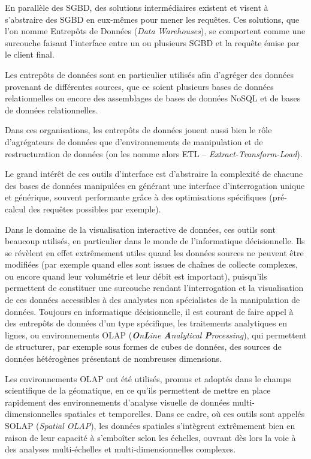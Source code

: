 			En parallèle des SGBD, des solutions intermédiaires existent et visent à s'abstraire des SGBD en eux-mêmes pour mener les requêtes.
			Ces solutions, que l'on nomme Entrepôts de Données (\textit{Data Warehouses}), se comportent comme une surcouche faisant l'interface entre un ou plusieurs SGBD et la requête émise par le client final.

			Les entrepôts de données sont en particulier utilisés afin d'agréger des données provenant de différentes sources, que ce soient plusieurs bases de données relationnelles ou encore des assemblages de bases de données NoSQL et de bases de données relationnelles.

			Dans ces organisations, les entrepôts de données jouent aussi bien le rôle d'agrégateurs de données que d'environnements de manipulation et de restructuration de données (on les nomme alors \og ETL\fg{} -- \textit{Extract-Transform-Load}).

			Le grand intérêt de ces outils d'interface est d'abstraire la complexité de chacune des bases de données manipulées en générant une interface d'interrogation unique et générique, souvent performante grâce à des optimisations spécifiques (pré-calcul des requêtes possibles par exemple).

			Dans le domaine de la visualisation interactive de données, ces outils sont beaucoup utilisés, en particulier dans le monde de l'informatique décisionnelle.
			Ils se révèlent en effet extrêmement utiles quand les données sources ne peuvent être modifiées (par exemple quand elles sont issues de chaînes de collecte complexes, ou encore quand leur volumétrie et leur débit est important), puisqu'ils permettent de constituer une surcouche rendant l'interrogation et la visualisation de ces données accessibles à des analystes non spécialistes de la manipulation de données.
			Toujours en informatique décisionnelle, il est courant de faire appel à des entrepôts de données d'un type spécifique, les \og traitements analytiques en lignes\fg{}, ou environnements OLAP (\textit{\textbf{O}n\textbf{L}ine \textbf{A}nalytical \textbf{P}rocessing}), qui permettent de structurer, par exemple sous formes de cubes de données, des sources de données hétérogènes présentant de nombreuses dimensions.

			Les environnements OLAP ont été utilisés, promus et adoptés dans le champs scientifique de la géomatique, en ce qu'ils permettent de mettre en place rapidement des environnements d'analyse visuelle de données multi-dimensionnelles spatiales et temporelles.
			Dans ce cadre, où ces outils sont appelés \og SOLAP\fg{} (\textit{Spatial OLAP}), les données spatiales s'intègrent extrêmement bien en raison de leur capacité à s'emboîter selon les échelles, ouvrant dès lors la voie à des analyses multi-échelles et multi-dimensionnelles complexes.

